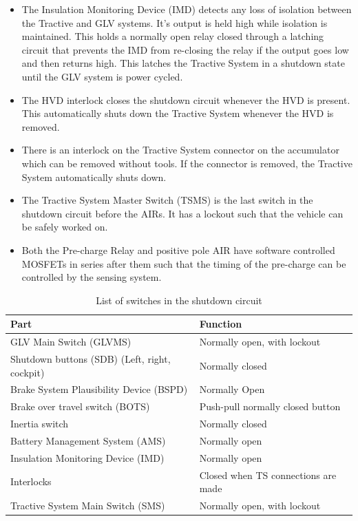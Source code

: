 \documentclass{article}
\begin{document}
\begin{itemize}
		\item The Insulation Monitoring Device (IMD) detects any loss of isolation between the Tractive and GLV systems. It's output is held high while isolation is maintained. This holds a normally open relay closed through a latching circuit that prevents the IMD from re-closing the relay if the output goes low and then returns high. This latches the Tractive System in a shutdown state until the GLV system is power cycled. 
		\item The HVD interlock closes the shutdown circuit whenever the HVD is present. This automatically shuts down the Tractive System whenever the HVD is removed. 
		\item There is an interlock on the Tractive System connector on the accumulator which can be removed without tools. If the connector is removed, the Tractive System automatically shuts down. 
		\item The Tractive System Master Switch (TSMS) is the last switch in the shutdown circuit before the AIRs. It has a lockout such that the vehicle can be safely worked on. 
		\item Both the Pre-charge Relay and positive pole AIR have software controlled MOSFETs in series after them such that the timing of the pre-charge can be controlled by the sensing system.  
	\end{itemize}

	\begin{table}[H]
        \centering
        \begin{tabular}{|l|l|}
        \hline
            \textbf{Part} & \textbf{Function} \\ \hline
            GLV Main Switch (GLVMS) & Normally open, with lockout \\ \hline
            Shutdown buttons (SDB) (Left, right, cockpit) & Normally closed \\ \hline
            Brake System Plausibility Device (BSPD) & Normally Open \\ \hline
            Brake over travel switch (BOTS) & Push-pull normally closed button \\ \hline
            Inertia switch & Normally closed \\ \hline
            Battery Management System (AMS) & Normally open \\ \hline
            Insulation Monitoring Device (IMD) & Normally open \\ \hline
            Interlocks & Closed when TS connections are made \\ \hline
            Tractive System Main Switch (SMS) & Normally open, with lockout \\ \hline
        \end{tabular}
        \caption{List of switches in the shutdown circuit}
        \label{switchlist}
    \end{table}
\end{document}
